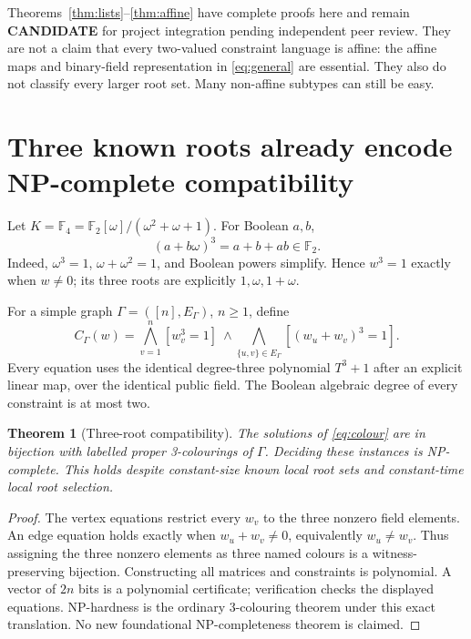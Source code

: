 \documentclass[11pt]{article}
\newtheorem{theorem}{Theorem}
\newcommand{\F}{\mathbb F}
\newcommand{\CAND}{\textbf{CANDIDATE}}
\begin{document}
Theorems~\ref{thm:lists}--\ref{thm:affine} have complete proofs here and remain
\CAND{} for project integration pending independent peer review. They are
not a claim that every two-valued constraint language is affine: the affine
maps and binary-field representation in \eqref{eq:general} are essential.
They also do not classify every larger root set. Many non-affine subtypes
can still be easy.

\section{Three known roots already encode NP-complete compatibility}
Let $K=\F_4=\F_2[\omega]/(\omega^2+\omega+1)$. For Boolean $a,b$,
\begin{equation}\label{eq:norm}
 (a+b\omega)^3=a+b+ab\in\F_2.
\end{equation}
Indeed, $\omega^3=1$, $\omega+\omega^2=1$, and Boolean powers simplify.
Hence $w^3=1$ exactly when $w\ne0$; its three roots are explicitly
$1,\omega,1+\omega$.

For a simple graph $\Gamma=([n],E_\Gamma)$, $n\ge1$, define
\begin{equation}\label{eq:colour}
 C_\Gamma(w)=
 \bigwedge_{v=1}^n[w_v^3=1]\ \land\!
 \bigwedge_{\{u,v\}\in E_\Gamma}[(w_u+w_v)^3=1].
\end{equation}
Every equation uses the identical degree-three polynomial $T^3+1$ after an
explicit linear map, over the identical public field. The Boolean algebraic
degree of every constraint is at most two.

\begin{theorem}[Three-root compatibility]\label{thm:colour}
The solutions of \eqref{eq:colour} are in bijection with labelled proper
3-colourings of $\Gamma$. Deciding these instances is NP-complete. This
holds despite constant-size known local root sets and constant-time local
root selection.
\end{theorem}
\begin{proof}
The vertex equations restrict every $w_v$ to the three nonzero field
elements. An edge equation holds exactly when $w_u+w_v\ne0$, equivalently
$w_u\ne w_v$. Thus assigning the three nonzero elements as three named
colours is a witness-preserving bijection. Constructing all matrices and
constraints is polynomial. A vector of $2n$ bits is a polynomial certificate;
verification checks the displayed equations. NP-hardness is the ordinary
3-colouring theorem under this exact translation. No new foundational
NP-completeness theorem is claimed.
\end{proof}
\end{document}
